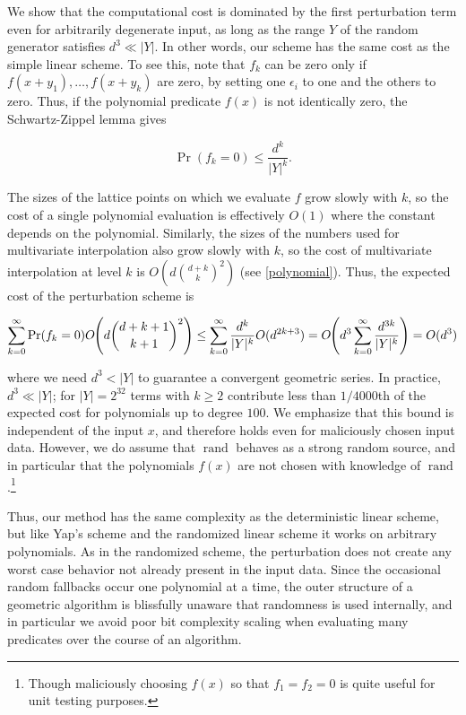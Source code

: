 \documentclass[11pt]{article}
\newcommand{\rand}{\operatorname{rand}}
\begin{document}
We show that the computational cost is dominated by the first perturbation term even for arbitrarily degenerate input, as long as the range $Y$ of the random generator
satisfies $d^3 \ll |Y|$.  In other words, our scheme has the same cost as the simple linear scheme.  To see this, note that $f_k$ can be zero only if $f(x + y_1), \ldots, f(x + y_k)$ are zero,
by setting one $\epsilon_i$ to one and the others to zero.  Thus, if the polynomial predicate $f(x)$ is not identically zero, the Schwartz-Zippel lemma gives
\begin{linenomath*}
$$\Pr(f_k = 0) \le \frac{d^k}{|Y|^k}.$$
\end{linenomath*}
The sizes of the lattice points on which we evaluate $f$ grow slowly with $k$, so the cost of a single polynomial evaluation is effectively $O(1)$ where the constant depends on the
polynomial.  Similarly, the sizes of the numbers used for multivariate interpolation also grow slowly with $k$, so the cost of multivariate
interpolation at level $k$ is $O\left(d \binom{d + k}{k}^2\right)$ (see \autoref{polynomial}).  Thus, the expected cost of the perturbation scheme is
\begin{linenomath*}
\begin{align*}
\sum_{k = 0}^\infty \Pr(f_k = 0) O\hspace{-.25em}\left(d \binom{d + k + 1}{k + 1}^2\right) \le \sum_{k = 0}^\infty \frac{d^k}{|Y|^k} O(d^{2k+3})
  = O\hspace{-.25em}\left(d^3 \sum_{k = 0}^\infty \frac{d^{3k}}{|Y|^k} \right) = O(d^3)
\end{align*}
\end{linenomath*}
where we need $d^3 < |Y|$ to guarantee a convergent geometric series.  In practice, $d^3 \ll |Y|$; for $|Y| = 2^{32}$ terms with $k \ge 2$ contribute less than $1/4000$th of the expected cost
for polynomials up to degree $100$.  We emphasize that this bound is independent of the input $x$, and therefore holds even for maliciously chosen input data.  However, we do
assume that $\rand$ behaves as a strong random source, and in particular that the polynomials $f(x)$ are not chosen with knowledge of $\rand$.\footnote{Though maliciously
choosing $f(x)$ so that $f_1 = f_2 = 0$ is quite useful for unit testing purposes.}

Thus, our method has the same complexity as the deterministic linear scheme, but like Yap's scheme and the randomized linear scheme it works on arbitrary polynomials.  As in the
randomized scheme, the perturbation does not create any worst case behavior not already present in the input data.  Since the occasional random fallbacks occur one
polynomial at a time, the outer structure of a geometric algorithm is blissfully unaware that randomness is used internally, and in particular we avoid poor bit complexity
scaling when evaluating many predicates over the course of an algorithm.
\end{document}
